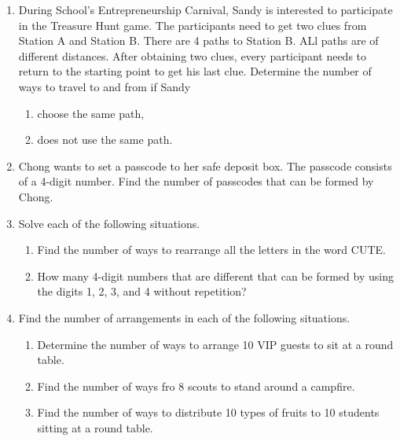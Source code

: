 \documentclass{report}
\begin{document}
\begin{multicols*}{2}
\begin{enumerate}
            \item During School's Entrepreneurship Carnival, Sandy is interested to participate
                  in the Treasure Hunt game. The participants need to get two clues from Station
                  A and Station B. There are 4 paths to Station B. ALl paths are of different
                  distances. After obtaining two clues, every participant needs to return to the
                  starting point to get his last clue. Determine the number of ways to travel to
                  and from if Sandy
                  \begin{enumerate}
                        \item choose the same path,
                        \item does not use the same path.
                  \end{enumerate}

            \item Chong wants to set a passcode to her safe deposit box. The passcode consists of
                  a 4-digit number. Find the number of passcodes that can be formed by Chong.

            \item Solve each of the following situations.
                  \begin{enumerate}
                        \item Find the number of ways to rearrange all the letters in the word CUTE.
                        \item How many 4-digit numbers that are different that can be formed by using the
                              digits 1, 2, 3, and 4 without repetition?
                  \end{enumerate}

            \item Find the number of arrangements in each of the following situations.
                  \begin{enumerate}
                        \item Determine the number of ways to arrange 10 VIP guests to sit at a round table.
                        \item Find the number of ways fro 8 scouts to stand around a campfire.
                        \item Find the number of ways to distribute 10 types of fruits to 10 students sitting
                              at a round table.
                  \end{enumerate}


\end{enumerate}
\end{multicols*}
\end{document}
